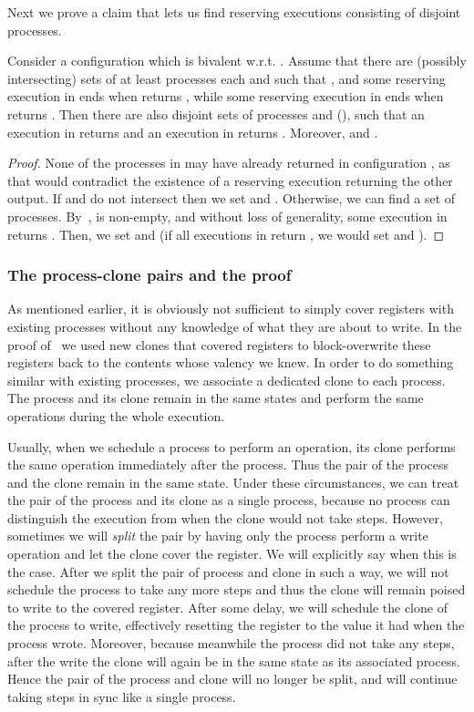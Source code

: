 Next we prove a claim that lets us find reserving executions consisting of disjoint processes. 
\begin{claim}
\label{clm:disjoint}
Consider a configuration  which is bivalent w.r.t. .
Assume that there are (possibly intersecting) sets of at least  processes each  and  
  such that ,
  and some reserving execution in  ends when  returns ,
  while some reserving execution in  ends when  returns .
Then there are also disjoint sets of processes  and  (), 
  such that an execution in  returns  and an execution in  returns . 
Moreover,  and . 
\end{claim}
\begin{proof}
None of the processes in  may have already returned in configuration ,
  as that would contradict the existence of a reserving execution returning the other output. 
If  and  do not intersect then we set  and .
Otherwise, we can find a set  of  processes.
By~,  is non-empty, 
  and without loss of generality, some execution in  returns .
Then, we set  and  (if all executions in  return , we would set  and ).
\end{proof}
\subsubsection{The process-clone pairs and the proof}
As mentioned earlier, it is obviously not sufficient to simply cover registers with existing processes
  without any knowledge of what they are about to write.
In the proof of~ we used new clones that covered registers to block-overwrite these registers 
  back to the contents whose valency we knew.
In order to do something similar with existing processes, we associate a dedicated clone to each process.
The process and its clone remain in the same states and perform the same operations during the whole execution.

Usually, when we schedule a process to perform an operation,
  its clone performs the same operation immediately after the process.  
  Thus the pair of the process and the clone remain in the same state.
Under these circumstances, we can treat the pair of the process and its clone as a single process,
  because no process can distinguish the execution from when the clone would not take steps.
However, sometimes we will \emph{split} the pair by having only the process perform a write operation 
  and let the clone cover the register.
We will explicitly say when this is the case.
After we split the pair of process and clone in such a way, 
  we will not schedule the process to take any more steps and thus the clone will remain poised to write to the covered register.
After some delay, we will schedule the clone of the process to write, 
  effectively resetting the register to the value it had when the process wrote. 
Moreover, because meanwhile the process did not take any steps,
  after the write the clone will again be in the same state as its associated process.
Hence the pair of the process and clone will no longer be split, 
  and will continue taking steps in sync like a single process.

